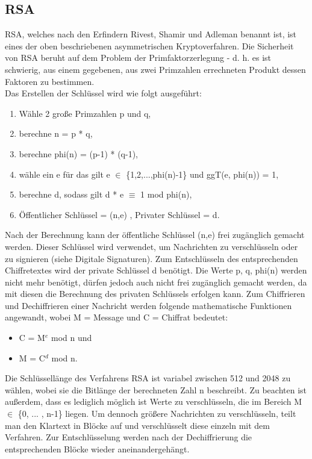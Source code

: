 \documentclass[10pt, a4paper,headsepline]{scrreprt}
\begin{document}
\subsection{RSA}
RSA, welches nach den Erfindern Rivest, Shamir und Adleman benannt ist, ist eines der oben beschriebenen asymmetrischen Kryptoverfahren. Die Sicherheit von RSA beruht auf dem Problem der Primfaktorzerlegung - d. h. es ist schwierig, aus einem gegebenen, aus zwei Primzahlen errechneten Produkt dessen Faktoren zu bestimmen. \\
Das Erstellen der Schlüssel wird wie folgt ausgeführt: \\
\begin{enumerate}
\item Wähle 2 große Primzahlen p und q, 
\item berechne n = p * q, 
\item berechne phi(n) = (p-1) * (q-1), 
\item wähle ein e für das gilt e $\in$ \{1,2,...,phi(n)-1\} und ggT(e, phi(n)) = 1, 
\item berechne d, sodass gilt d * e $\equiv$ 1 mod phi(n), 
\item Öffentlicher Schlüssel = (n,e) , Privater Schlüssel = d. \\
\end{enumerate} 
Nach der Berechnung kann der öffentliche Schlüssel (n,e) frei zugänglich gemacht werden. Dieser Schlüssel wird verwendet, um Nachrichten zu verschlüsseln oder zu signieren (siehe Digitale Signaturen). Zum Entschlüsseln des entsprechenden Chiffretextes wird der private Schlüssel d benötigt. Die Werte p, q, phi(n) werden nicht mehr benötigt, dürfen jedoch auch nicht frei zugänglich gemacht werden, da mit diesen die Berechnung des privaten Schlüssels erfolgen kann. Zum Chiffrieren und Dechiffrieren einer Nachricht werden folgende mathematische Funktionen angewandt, wobei M = Message und C = Chiffrat bedeutet: \\
\begin{itemize}
\item C = M$^{e}$ mod n und
\item M = C$^{d}$ mod n. \\
\end{itemize}
Die Schlüssellänge des Verfahrens RSA ist variabel zwischen 512 und 2048 zu wählen, wobei sie die Bitlänge der berechneten Zahl n beschreibt. Zu beachten ist außerdem, dass es lediglich möglich ist Werte zu verschlüsseln, die im Bereich M $\in$ \{0, ... , n-1\} liegen. Um dennoch größere Nachrichten zu verschlüsseln, teilt man den Klartext in Blöcke auf und verschlüsselt diese einzeln mit dem Verfahren. Zur Entschlüsselung werden nach der Dechiffrierung die entsprechenden Blöcke wieder aneinandergehängt. \\
\end{document}
